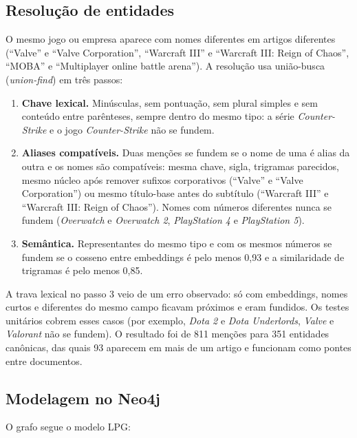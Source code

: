 \documentclass[12pt]{article}
\begin{document}
\subsection{Resolução de entidades}
O mesmo jogo ou empresa aparece com nomes diferentes em artigos diferentes (``Valve'' e ``Valve Corporation'', ``Warcraft III'' e ``Warcraft III: Reign of Chaos'', ``MOBA'' e ``Multiplayer online battle arena''). A resolução usa união-busca (\emph{union-find}) em três passos:

\begin{enumerate}\item \textbf{Chave lexical.} Minúsculas, sem pontuação, sem plural simples e sem conteúdo entre parênteses, sempre dentro do mesmo tipo: a série \emph{Counter-Strike} e o jogo \emph{Counter-Strike} não se fundem.
\item \textbf{Aliases compatíveis.} Duas menções se fundem se o nome de uma é alias da outra e os nomes são compatíveis: mesma chave, sigla, trigramas parecidos, mesmo núcleo após remover sufixos corporativos (``Valve'' e ``Valve Corporation'') ou mesmo título-base antes do subtítulo (``Warcraft III'' e ``Warcraft III: Reign of Chaos''). Nomes com números diferentes nunca se fundem (\emph{Overwatch} e \emph{Overwatch 2}, \emph{PlayStation 4} e \emph{PlayStation 5}).
\item \textbf{Semântica.} Representantes do mesmo tipo e com os mesmos números se fundem se o cosseno entre embeddings é pelo menos 0,93 e a similaridade de trigramas é pelo menos 0,85.
\end{enumerate}
A trava lexical no passo 3 veio de um erro observado: só com embeddings, nomes curtos e diferentes do mesmo campo ficavam próximos e eram fundidos. Os testes unitários cobrem esses casos (por exemplo, \emph{Dota 2} e \emph{Dota Underlords}, \emph{Valve} e \emph{Valorant} não se fundem). O resultado foi de 811 menções para 351 entidades canônicas, das quais 93 aparecem em mais de um artigo e funcionam como pontes entre documentos.

\subsection{Modelagem no Neo4j}
O grafo segue o modelo LPG:
\end{document}
